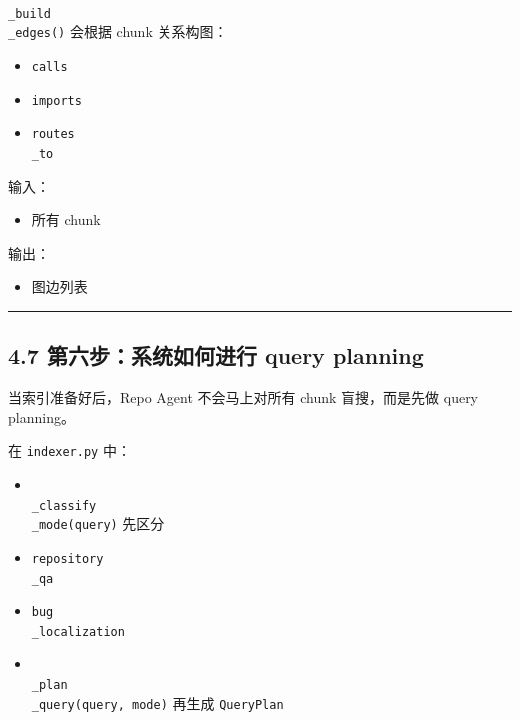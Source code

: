 \documentclass[UTF8,12pt,openany]{ctexbook}
\begin{document}
\texttt{\\_build\\_edges()} 会根据 chunk 关系构图：\par

\begin{itemize}
\item \texttt{calls}
\item \texttt{imports}
\item \texttt{routes\\_to}
\end{itemize}

输入：\par

\begin{itemize}
\item 所有 chunk
\end{itemize}

输出：\par

\begin{itemize}
\item 图边列表
\end{itemize}

\hrule

\subsection{4.7 第六步：系统如何进行 query planning}

当索引准备好后，Repo Agent 不会马上对所有 chunk 盲搜，而是先做 query planning。\par

在 \texttt{indexer.py} 中：\par

\begin{itemize}
\item \texttt{\\_classify\\_mode(query)} 先区分
\item \texttt{repository\\_qa}
\item \texttt{bug\\_localization}
\end{itemize}

\begin{itemize}
\item \texttt{\\_plan\\_query(query, mode)} 再生成 \texttt{QueryPlan}
\end{itemize}
\end{document}
